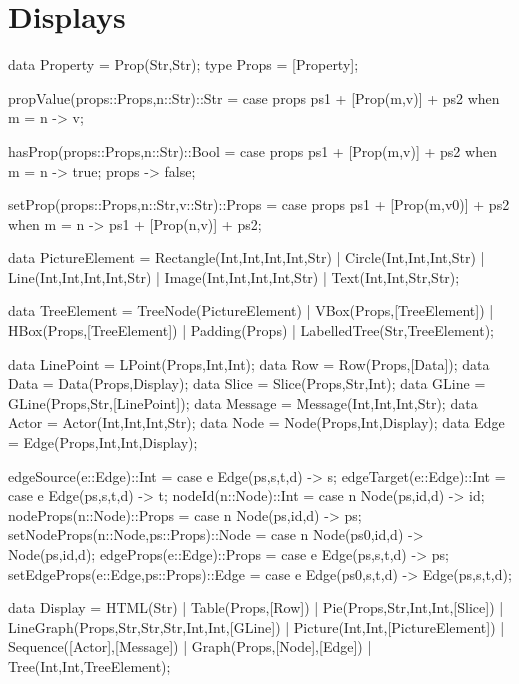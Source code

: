 \documentclass[5p,times]{elsarticle}
\begin{document}
\section{Displays}

\label{sec:display_definitions}

\begin{ESL}
data Property = Prop(Str,Str);
type Props    = [Property];

propValue(props::Props,n::Str)::Str = 
  case props { 
    ps1 + [Prop(m,v)] + ps2 when m = n -> v; 
  }
  
hasProp(props::Props,n::Str)::Bool = 
  case props { 
    ps1 + [Prop(m,v)] + ps2 when m = n -> true; 
    props -> false; 
  }
  
setProp(props::Props,n::Str,v::Str)::Props = 
  case props { 
    ps1 + [Prop(m,v0)] + ps2 when m = n -> 
      ps1 + [Prop(n,v)] + ps2; 
  }


data PictureElement = 
  Rectangle(Int,Int,Int,Int,Str)
| Circle(Int,Int,Int,Str)
| Line(Int,Int,Int,Int,Str)
| Image(Int,Int,Int,Int,Str)
| Text(Int,Int,Str,Str);

data TreeElement = 
   TreeNode(PictureElement)
|  VBox(Props,[TreeElement])
|  HBox(Props,[TreeElement])
|  Padding(Props)
|  LabelledTree(Str,TreeElement);

data LinePoint = LPoint(Props,Int,Int);
data Row       = Row(Props,[Data]);
data Data      = Data(Props,Display);
data Slice     = Slice(Props,Str,Int);
data GLine     = GLine(Props,Str,[LinePoint]);
data Message   = Message(Int,Int,Int,Str);
data Actor     = Actor(Int,Int,Int,Str);
data Node      = Node(Props,Int,Display);
data Edge      = Edge(Props,Int,Int,Display);

edgeSource(e::Edge)::Int  = case e { Edge(ps,s,t,d) -> s; }
edgeTarget(e::Edge)::Int  = case e { Edge(ps,s,t,d) -> t; }
nodeId(n::Node)::Int      = case n { Node(ps,id,d) -> id; }
nodeProps(n::Node)::Props = case n { Node(ps,id,d) -> ps; }
setNodeProps(n::Node,ps::Props)::Node = 
  case n { Node(ps0,id,d) -> Node(ps,id,d); }
edgeProps(e::Edge)::Props = 
  case e { Edge(ps,s,t,d) -> ps; }
setEdgeProps(e::Edge,ps::Props)::Edge = 
  case e { Edge(ps0,s,t,d) -> Edge(ps,s,t,d); }

data Display =         
  HTML(Str)           
| Table(Props,[Row])       
| Pie(Props,Str,Int,Int,[Slice])   
| LineGraph(Props,Str,Str,Str,Int,Int,[GLine]) 
| Picture(Int,Int,[PictureElement])   
| Sequence([Actor],[Message])    
| Graph(Props,[Node],[Edge])   
| Tree(Int,Int,TreeElement);   
\end{ESL}
\end{document}
